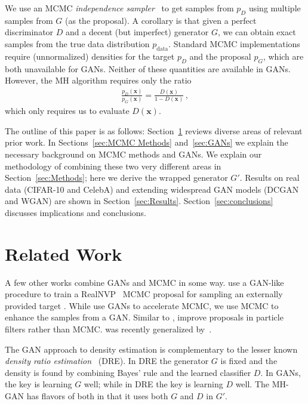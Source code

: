 \documentclass{article}
\renewcommand{\vec}[1]{{\boldsymbol{\mathbf{#1}}}} %
\newcommand{\target}{{p^\star}}
\newcommand{\PG}{{p_G}}
\newcommand{\PD}{{p_D}}
\newcommand{\PR}{{p_{\textrm{data}}}}
\begin{document}
We use an MCMC \emph{independence sampler}~\citep{Tierney1994} to get samples from $\PD$ using multiple samples from $G$ (as the proposal)\@.
A corollary is that given a perfect discriminator $D$ and a decent (but imperfect) generator $G$, we can obtain exact samples from the true data distribution $\PR$.
Standard MCMC implementations require (unnormalized) densities for the target $\PD$ and the proposal $\PG$, which are both unavailable for GANs.
Neither of these quantities are available in GANs.
However, the MH algorithm requires only the ratio
\begin{align}
  \frac{\PD(\vec x)}{\PG(\vec x)} = \frac{D(\vec x)}{1 - D(\vec x)}\,, \label{eq:PD inv}
\end{align}
which only requires us to evaluate $D(\vec x)$.



The outline of this paper is as follows:
Section~\ref{sec:Related Work} reviews diverse areas of relevant prior work.
In Sections~\ref{sec:MCMC Methods} and~\ref{sec:GANs} we explain the necessary background on MCMC methods and GANs.
We explain our methodology of combining these two very different areas in Section~\ref{sec:Methods}; here we derive the wrapped generator $G'$.
Results on real data (CIFAR-10 and CelebA) and extending widespread GAN models (DCGAN and WGAN) are shown in Section~\ref{sec:Results}.
Section~\ref{sec:conclusions} discusses implications and conclusions.

\section{Related Work}
\label{sec:Related Work}

A few other works combine GANs and MCMC in some way.
\citet{Song2017} use a GAN-like procedure to train a RealNVP~\citep{Dinh2016} MCMC proposal for sampling an externally provided target \smash{$\target$}.
While \citet{Song2017} use GANs to accelerate MCMC, we use MCMC to enhance the samples from a GAN\@.
Similar to \cite{Song2017}, \citet{Kempinska2017} improve proposals in particle filters rather than MCMC\@.
\citet{Song2017} was recently generalized by~\citet{Neklyudov2018}.

The GAN approach to density estimation is complementary to the lesser known \emph{density ratio estimation}~\citep{Sugiyama2012} (DRE)\@.
In DRE the generator $G$ is fixed and the density is found by combining Bayes' rule and the learned classifier $D$.
In GANs, the key is learning $G$ well; while in DRE the key is learning $D$ well.
The MH-GAN has flavors of both in that it uses both $G$ and $D$ in $G'$.
\end{document}
